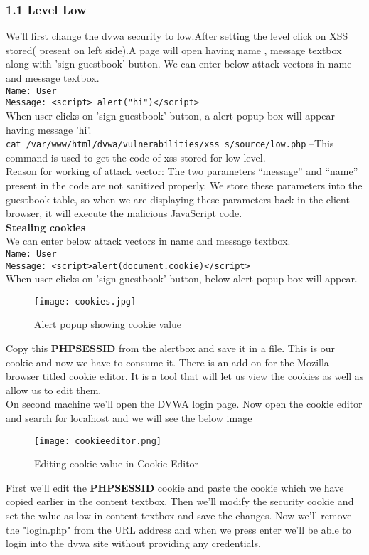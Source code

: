 \documentclass{article}
\begin{document}
\subsubsection*{1.1 Level Low}
We'll first change the dvwa security to low.After setting the level click on XSS stored( present on left side).A page will open having name , message textbox along with 'sign guestbook' button. We can enter below attack vectors in name and message textbox.\\
{\tt Name: User}\\
{\tt Message: <script> alert("hi")</script>}\\
When user clicks on 'sign guestbook' button, a alert popup box will appear having message 'hi'.\\
{\tt cat /var/www/html/dvwa/vulnerabilities/xss\_s/source/low.php} --This command is used to get the code of xss stored for low level.\\
Reason for working of attack vector: The two parameters “message” and “name” present in the code are not sanitized properly. We store these
parameters into the guestbook table, so when we are displaying these parameters back in the client browser,
it will execute the malicious JavaScript code.\\
\textbf{Stealing cookies}\\
 We can enter below attack vectors in name and message textbox.\\
{\tt Name: User}\\
{\tt Message: <script>alert(document.cookie)</script>}\\
When user clicks on 'sign guestbook' button, below alert popup box will appear.\\
	\begin{figure}[htb]
	    \begin{center}
		\texttt{[image: cookies.jpg]}
		\caption{Alert popup showing cookie value}
	    \end{center}
	\end{figure}

Copy this {\bf PHPSESSID} from the alertbox and save it in a file. This is our cookie and now we have to consume it. There is an add-on for the Mozilla browser titled cookie editor. It is a tool that will let us view the cookies as well as allow us to edit them.\\
On second machine we'll open the DVWA login page. Now open the cookie editor and search for localhost and we will see the below image
	\begin{figure}[htb]
	    \begin{center}
		\texttt{[image: cookieeditor.png]}
		\caption{Editing cookie value in Cookie Editor}
	    \end{center}
	\end{figure}
First we'll edit the {\bf PHPSESSID} cookie and paste the cookie which we have copied earlier in the content textbox. Then we'll modify the security cookie and set the value as low in content textbox and save the changes. Now we'll remove the "login.php" from the URL address and when we press enter we'll be able to login into the dvwa site without providing any credentials.
\end{document}
